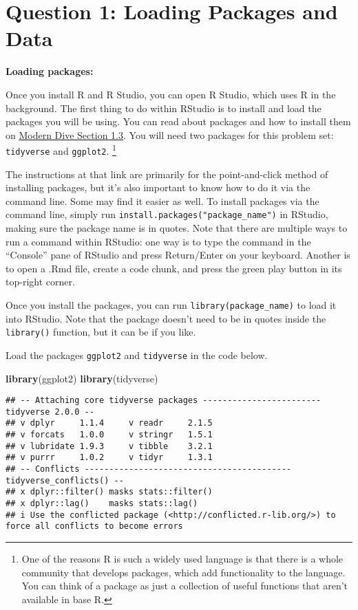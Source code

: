 \documentclass[
]{article}
\newenvironment{Shaded}{\begin{snugshade}}{\end{snugshade}}
\newcommand{\FunctionTok}[1]{\textcolor[rgb]{0.13,0.29,0.53}{\textbf{#1}}}
\newcommand{\NormalTok}[1]{#1}
\begin{document}
\section{Question 1: Loading Packages and
Data}\label{question-1-loading-packages-and-data}

\textbf{Loading packages:}

Once you install R and R Studio, you can open R Studio, which uses R in
the background. The first thing to do within RStudio is to install and
load the packages you will be using. You can read about packages and how
to install them on
\href{https://moderndive.netlify.app/1-getting-started.html\#packages}{Modern
Dive Section 1.3}. You will need two packages for this problem set:
\texttt{tidyverse} and \texttt{ggplot2}.
\footnote{One of the reasons R is such a widely used language is that there is a whole community that develops packages, which add functionality to the language. You can think of a package as just a collection of useful functions that aren't available in base R.}

The instructions at that link are primarily for the point-and-click
method of installing packages, but it's also important to know how to do
it via the command line. Some may find it easier as well. To install
packages via the command line, simply run
\texttt{install.packages("package\_name")} in RStudio, making sure the
package name is in quotes. Note that there are multiple ways to run a
command within RStudio: one way is to type the command in the
``Console'' pane of RStudio and press Return/Enter on your keyboard.
Another is to open a .Rmd file, create a code chunk, and press the green
play button in its top-right corner.

Once you install the packages, you can run
\texttt{library(package\_name)} to load it into RStudio. Note that the
package doesn't need to be in quotes inside the \texttt{library()}
function, but it can be if you like.

Load the packages \texttt{ggplot2} and \texttt{tidyverse} in the code
below.

\begin{Shaded}
\begin{Highlighting}[]
\FunctionTok{library}\NormalTok{(ggplot2)}
\FunctionTok{library}\NormalTok{(tidyverse)}
\end{Highlighting}
\end{Shaded}

\begin{verbatim}
## -- Attaching core tidyverse packages ------------------------ tidyverse 2.0.0 --
## v dplyr     1.1.4     v readr     2.1.5
## v forcats   1.0.0     v stringr   1.5.1
## v lubridate 1.9.3     v tibble    3.2.1
## v purrr     1.0.2     v tidyr     1.3.1
## -- Conflicts ------------------------------------------ tidyverse_conflicts() --
## x dplyr::filter() masks stats::filter()
## x dplyr::lag()    masks stats::lag()
## i Use the conflicted package (<http://conflicted.r-lib.org/>) to force all conflicts to become errors
\end{verbatim}
\end{document}

